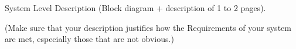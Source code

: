 System Level Description (Block diagram + description of 1 to 2 pages).


(Make sure that your description justifies how the Requirements of your system are met, especially those that are not obvious.)
